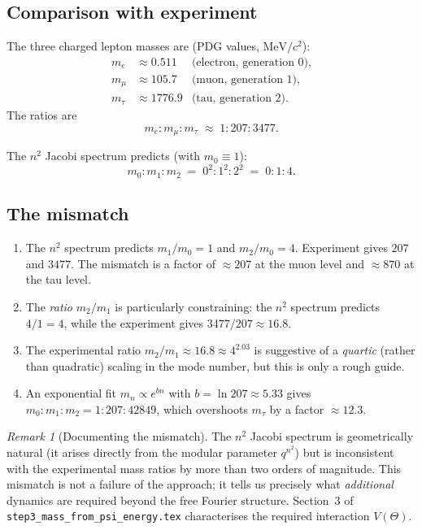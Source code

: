 \documentclass[12pt,a4paper]{article}
\theoremstyle{remark}
\newtheorem{remark}[theorem]{Remark}
\begin{document}
\subsection{Comparison with experiment}

The three charged lepton masses are (PDG values, $\text{MeV}/c^2$):
\begin{align}
  m_e    &\approx 0.511  &\text{(electron, generation 0)}, \\
  m_\mu  &\approx 105.7  &\text{(muon, generation 1)}, \\
  m_\tau &\approx 1776.9 &\text{(tau, generation 2)}.
\end{align}
The ratios are
\begin{equation}
  m_e : m_\mu : m_\tau
  \;\approx\; 1 : 207 : 3477.
\end{equation}

The $n^2$ Jacobi spectrum predicts (with $m_0\equiv 1$):
\begin{equation}
  m_0 : m_1 : m_2
  \;=\; 0^2 : 1^2 : 2^2
  \;=\; 0 : 1 : 4.
\end{equation}

\subsection{The mismatch}

\begin{enumerate}[label=(\roman*)]
  \item The $n^2$ spectrum predicts $m_1/m_0 = 1$ and $m_2/m_0 = 4$.
        Experiment gives $207$ and $3477$.  The mismatch is a factor of
        $\approx 207$ at the muon level and $\approx 870$ at the tau level.
  \item The \emph{ratio} $m_2/m_1$ is particularly constraining:
        the $n^2$ spectrum predicts $4/1=4$, while the experiment gives
        $3477/207 \approx 16.8$.
  \item The experimental ratio $m_2/m_1 \approx 16.8 \approx 4^{2.03}$
        is suggestive of a \emph{quartic} (rather than quadratic) scaling
        in the mode number, but this is only a rough guide.
  \item An exponential fit $m_n \propto e^{bn}$ with $b=\ln 207\approx
        5.33$ gives $m_0:m_1:m_2 = 1:207:42849$, which overshoots
        $m_\tau$ by a factor $\approx 12.3$.
\end{enumerate}

\begin{remark}[Documenting the mismatch]
The $n^2$ Jacobi spectrum is geometrically natural (it arises directly
from the modular parameter $q^{n^2}$) but is inconsistent with the
experimental mass ratios by more than two orders of magnitude.  This
mismatch is not a failure of the approach; it tells us precisely what
\emph{additional} dynamics are required beyond the free Fourier structure.
Section~3 of \texttt{step3\_mass\_from\_psi\_energy.tex} characterises
the required interaction $V(\Theta)$.
\end{remark}
\end{document}

